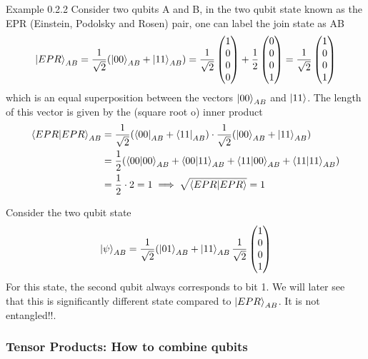 \begin{example}
    Example 0.2.2 Consider two qubits A and B, in the two qubit state known as the EPR (Einstein, Podolsky and Rosen) pair, one can label the join state as AB
    \[
    \ket{EPR}_{AB}=\frac{1}{\sqrt{2}}(\ket{00}_{AB}+\ket{11}_{AB})=\frac{1}{\sqrt{2}}\begin{pmatrix} 1 \\ 0 \\ 0 \\ 0 \end{pmatrix} + \frac{1}{2}\begin{pmatrix} 0 \\ 0 \\ 0 \\ 1 \end{pmatrix}=\frac{1}{\sqrt{2}}\begin{pmatrix} 1 \\ 0 \\ 0 \\ 1 \end{pmatrix}
    \]
    which is an equal superposition between the vectors $\ket{00}_{AB}$ and $\ket{11}$. The length of this vector is given by the (square root o) inner product
    \begin{align*}
    \braket{EPR|EPR}_{AB}&=\frac{1}{\sqrt{2}}(\bra{00}_{AB}+\bra{11}_{AB})\cdot \frac{1}{\sqrt{2}}(\ket{00}_{AB}+\ket{11}_{AB})\\
    &=\frac{1}{2}(\braket{00|00}_{AB}+\braket{00|11}_{AB}+\braket{11|00}_{AB}+\braket{11|11}_{AB})\\
    &=\frac{1}{2}\cdot 2=1 \implies \sqrt{\braket{EPR|EPR}}=1
    \end{align*}
\end{example}
\begin{example}
    Consider the two qubit state
    \[
    \ket{\psi}_{AB}=\frac{1}{\sqrt{2}}(\ket{01}_{AB}+\ket{11}_{AB}\frac{1}{\sqrt{2}}\begin{pmatrix} 1\\ 0 \\ 0 \\ 1 \end{pmatrix}
    \]
    For this state, the second qubit always corresponds to bit 1. We will later see that this is significantly different state compared to $\ket{EPR}_{AB}$. It is not entangled!!.
\end{example}

\subsubsection{Tensor Products: How to combine qubits}

